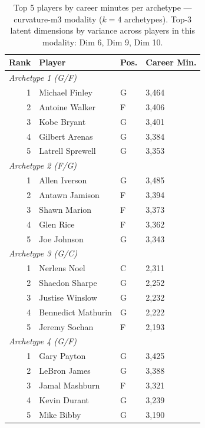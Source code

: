 \begin{table}[htbp]
  \centering\small
  \begin{tabular}{rlll}
    \toprule
    Rank & Player & Pos. & Career Min. \\
    \midrule
    \multicolumn{4}{l}{\textit{Archetype 1 (G/F)}} \\
    \midrule
    1 & Michael Finley & G & 3,464 \\
    2 & Antoine Walker & F & 3,406 \\
    3 & Kobe Bryant & G & 3,401 \\
    4 & Gilbert Arenas & G & 3,384 \\
    5 & Latrell Sprewell & G & 3,353 \\
    \midrule[0.4pt]
    \multicolumn{4}{l}{\textit{Archetype 2 (F/G)}} \\
    \midrule
    1 & Allen Iverson & G & 3,485 \\
    2 & Antawn Jamison & F & 3,394 \\
    3 & Shawn Marion & F & 3,373 \\
    4 & Glen Rice & F & 3,362 \\
    5 & Joe Johnson & G & 3,343 \\
    \midrule[0.4pt]
    \multicolumn{4}{l}{\textit{Archetype 3 (G/C)}} \\
    \midrule
    1 & Nerlens Noel & C & 2,311 \\
    2 & Shaedon Sharpe & G & 2,252 \\
    3 & Justise Winslow & G & 2,232 \\
    4 & Bennedict Mathurin & G & 2,222 \\
    5 & Jeremy Sochan & F & 2,193 \\
    \midrule[0.4pt]
    \multicolumn{4}{l}{\textit{Archetype 4 (G/F)}} \\
    \midrule
    1 & Gary Payton & G & 3,425 \\
    2 & LeBron James & G & 3,388 \\
    3 & Jamal Mashburn & F & 3,321 \\
    4 & Kevin Durant & G & 3,239 \\
    5 & Mike Bibby & G & 3,190 \\
    \bottomrule
  \end{tabular}
  \caption{Top 5 players by career minutes per archetype --- curvature-m3 modality ($k=4$ archetypes). Top-3 latent dimensions by variance across players in this modality: Dim 6, Dim 9, Dim 10.}
  \label{tab:arch_reps_curvature_m3}
\end{table}

